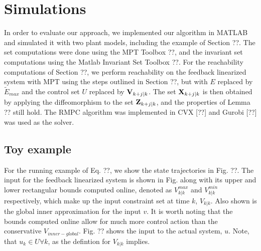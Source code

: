 \section{Simulations}
\label{sec:simulations}

In order to evaluate our approach, we implemented our algorithm in MATLAB and simulated it with two plant models, including the example of Section ??. The set computations were done using the MPT Toolbox ??, and the invariant set computations using the Matlab Invariant Set Toolbox ??. For the reachability computations of Section ??, we perform reachability on the feedback linearized system with MPT using the steps outlined in Section ??, but with $E$ replaced by $\tilde{E}_{max}$ and the control set $U$ replaced by $\mathbf{V}_{k+j|k}$. The set $\mathbf{X}_{k+j|k}$ is then obtained by applying the diffeomorphism to the set $\mathbf{Z}_{k+j|k}$, and the properties of Lemma ?? still hold. The RMPC algorithm was implemented in CVX [??] and Gurobi [??] was used as the solver.

\subsection{Toy example}

For the running example of Eq. ??, we show the state trajectories in Fig. ??. The input for the feedback linearized system is shown in Fig. along with its upper and lower rectangular bounds computed online, denoted as $ V^{max}_{k|k}$ and $ V^{min}_{k|k}$ respectively, which make up the input constraint set at time $k$, $V_{k|k}$. Also shown is the global inner approximation for the input $v$. It is worth noting that the bounds computed online allow for much more control action than the conservative $V_{inner-global}$. Fig. ?? shows the input to the actual system, $u$. Note, that $u_k \in U \forall k$, as the defintion for $V_{k|k}$ implies. 



